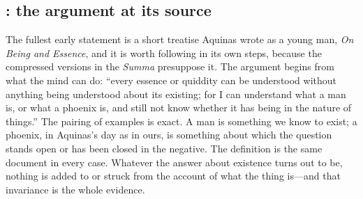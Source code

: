 \subsection{: the argument at its source}

The fullest early statement is a short treatise Aquinas wrote as a young man, \emph{On Being and Essence}, and it is worth following in its own steps, because the compressed versions in the \emph{Summa} presuppose it. The argument begins from what the mind can do: ``every essence or quiddity can be understood without anything being understood about its existing; for I can understand what a man is, or what a phoenix is, and still not know whether it has being in the nature of things.'' The pairing of examples is exact. A man is something we know to exist; a phoenix, in Aquinas's day as in ours, is something about which the question stands open or has been closed in the negative. The definition is the same document in every case. Whatever the answer about existence turns out to be, nothing is added to or struck from the account of what the thing is---and that invariance is the whole evidence.

